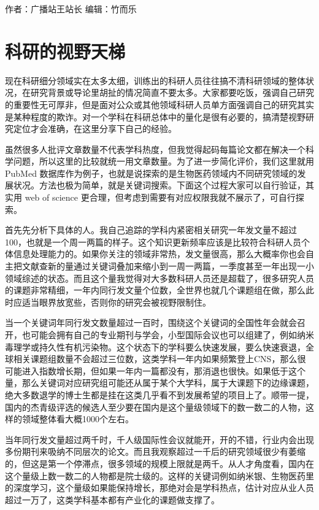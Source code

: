 \documentclass[
]{book}
\begin{document}
作者：广播站王站长
编辑：竹而乐

\hypertarget{ux79d1ux7814ux7684ux89c6ux91ceux5929ux68af}{%
\section{科研的视野天梯}\label{ux79d1ux7814ux7684ux89c6ux91ceux5929ux68af}}

现在科研细分领域实在太多太细，训练出的科研人员往往搞不清科研领域的整体状况，在研究背景或导论里胡扯的情况简直不要太多。大家都要吃饭，强调自己研究的重要性无可厚非，但是面对公众或其他领域科研人员单方面强调自己的研究其实是某种程度的欺诈。对一个学科在科研总体中的量化是很有必要的，搞清楚视野研究定位才会准确，在这里分享下自己的经验。

虽然很多人批评文章数量不代表学科热度，但我觉得起码每篇论文都在解决一个科学问题，所以这里的比较就统一用文章数量。为了进一步简化评价，我们这里就用 PubMed 数据库作为例子，也就是说探索的是生物医药领域内不同研究领域的发展状况。方法也极为简单，就是关键词搜索。下面这个过程大家可以自行验证，其实用 web of science 更合理，但考虑到需要有对应权限我就不展示了，可自行探索。

首先先分析下具体的人。我自己追踪的学科内紧密相关研究一年发文量不超过100，也就是一个周一两篇的样子。这个知识更新频率应该是比较符合科研人员个体信息处理能力的。如果你关注的领域非常热，发文量很高，那么大概率你也会自主把文献查新的量通过关键词叠加来缩小到一周一两篇，一季度甚至一年出现一小领域综述的状态。而且这个量我觉得对大多数科研人员还是超载了，很多研究人员的课题非常精细，一年内同行发文量个位数，全世界也就几个课题组在做，那么此时应适当眼界放宽些，否则你的研究会被视野限制住。

当一个关键词年同行发文数量超过一百时，围绕这个关键词的全国性年会就会召开，也可能会拥有自己的专业期刊与学会，小型国际会议也可以组建了，例如纳米毒理学或持久性有机污染物。这个状态下的学科要么快速发展，要么快速衰退，全球相关课题组数量不会超过三位数，这类学科一年内如果频繁登上CNS，那么很可能进入指数增长期，但如果一年内一篇都没有，那消退也很快。如果低于这个量，那么关键词对应研究组可能还从属于某个大学科，属于大课题下的边缘课题，绝大多数退学的博士生都是挂在这类几乎看不到发展希望的项目上了。顺带一提，国内的杰青级评选的候选人至少要在国内是这个量级领域下的数一数二的人物，这样的领域整体看大概1000个左右。

当年同行发文量超过两千时，千人级国际性会议就能开，开的不错，行业内会出现多份期刊来吸纳不同层次的论文。而且我观察超过一千后的研究领域很少有萎缩的，但这是第一个停滞点，很多领域的规模上限就是两千。从人才角度看，国内在这个量级上数一数二的人物都是院士级的。这样的关键词例如纳米银、生物医药里的深度学习，这个量级如果能保持增长，那绝对会是学科热点，估计对应从业人员超过一万了，这类学科基本都有产业化的课题做支撑了。
\end{document}
